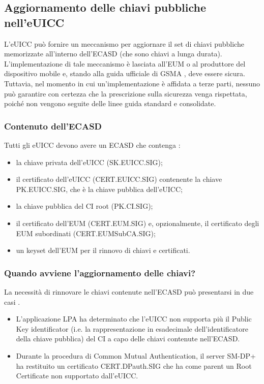\documentclass[10pt, oneside]{book}
\begin{document}
\subsection{Aggiornamento delle chiavi pubbliche nell'eUICC}
L'eUICC può fornire un meccanismo per aggiornare il set di chiavi pubbliche memorizzate all'interno dell'ECASD (che sono chiavi a lunga durata). L'implementazione di tale meccanismo è lasciata all'EUM o al produttore del dispositivo mobile e, stando alla guida ufficiale di GSMA \cite{GSMA-docs-new}, deve essere sicura. Tuttavia, nel momento in cui un'implementazione è affidata a terze parti, nessuno può garantire con certezza che la prescrizione sulla sicurezza venga rispettata, poiché non vengono seguite delle linee guida standard e consolidate.

\subsubsection{Contenuto dell'ECASD}
Tutti gli eUICC devono avere un ECASD che contenga \cite{GSMA-docs-new}:
\begin{itemize}[itemsep=0pt]
\item la chiave privata dell'eUICC (SK.EUICC.SIG);
\item il certificato dell'eUICC (CERT.EUICC.SIG) contenente la chiave PK.EUICC.SIG, che è la chiave pubblica dell'eUICC;
\item la chiave pubblica del CI root (PK.CI.SIG);
\item il certificato dell'EUM (CERT.EUM.SIG) e, opzionalmente, il certificato degli EUM subordinati (CERT.EUMSubCA.SIG);
\item un keyset dell'EUM per il rinnovo di chiavi e certificati.
\end{itemize}

\subsubsection{Quando avviene l'aggiornamento delle chiavi?}
La necessità di rinnovare le chiavi contenute nell'ECASD può presentarsi in due casi \cite{GSMA-docs-new}.
\begin{itemize}
\item L'applicazione LPA ha determinato che l'eUICC non supporta più il Public Key identificator (i.e. la rappresentazione in esadecimale dell'identificatore della chiave pubblica) del CI a capo delle chiavi contenute nell'ECASD.
\item Durante la procedura di Common Mutual Authentication, il server SM-DP+ ha restituito un certificato CERT.DPauth.SIG che ha come parent un Root Certificate non supportato dall'eUICC.
\end{itemize}
\end{document}

